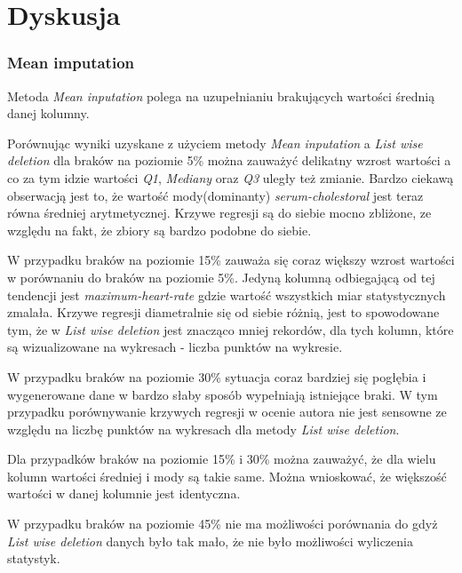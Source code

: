 \documentclass{classrep}
\begin{document}
    \section{Dyskusja}
    \label{summary} {

        \subsubsection{Mean imputation}
        \label{summary:mean-input} {
            Metoda \textit{Mean inputation} polega na uzupełnianiu brakujących wartości średnią
            danej kolumny.

            Porównując wyniki uzyskane z użyciem metody \textit{Mean inputation} a
            \textit{List wise deletion} dla braków na poziomie 5\% można zauważyć delikatny
            wzrost wartości a co za tym idzie wartości \textit{Q1}, \textit{Mediany} oraz \textit{Q3} uległy też zmianie.
            Bardzo ciekawą obserwacją jest to, że wartość mody(dominanty)  \textit{serum-cholestoral} jest
            teraz równa średniej arytmetycznej. Krzywe regresji są do siebie mocno zbliżone, ze względu na fakt, że zbiory są bardzo podobne do siebie.

            W przypadku braków na poziomie 15\% zauważa się coraz większy wzrost wartości
            w porównaniu do braków na poziomie 5\%. Jedyną kolumną odbiegającą od tej
            tendencji jest \textit{maximum-heart-rate} gdzie wartość wszystkich miar
            statystycznych zmalała. Krzywe regresji diametralnie się od siebie różnią,
            jest to spowodowane tym, że w \textit{List wise deletion} jest znacząco
            mniej rekordów, dla tych kolumn, które są wizualizowane na wykresach - liczba punktów na wykresie.

            W przypadku braków na poziomie 30\% sytuacja coraz bardziej się pogłębia
            i wygenerowane dane w bardzo słaby sposób wypełniają istniejące braki. W tym
            przypadku porównywanie krzywych regresji w ocenie autora nie jest sensowne ze
            względu na liczbę punktów na wykresach dla metody \textit{List wise deletion}.

            Dla przypadków braków na poziomie 15\% i 30\% można zauważyć, że dla wielu
            kolumn wartości średniej i mody są takie same. Można wnioskować, że większość wartości w danej kolumnie jest identyczna.

            W przypadku braków na poziomie 45\% nie ma możliwości porównania do
            gdyż \textit{List wise deletion} danych było tak mało, że nie było możliwości
            wyliczenia statystyk.
        }

}
\end{document}
